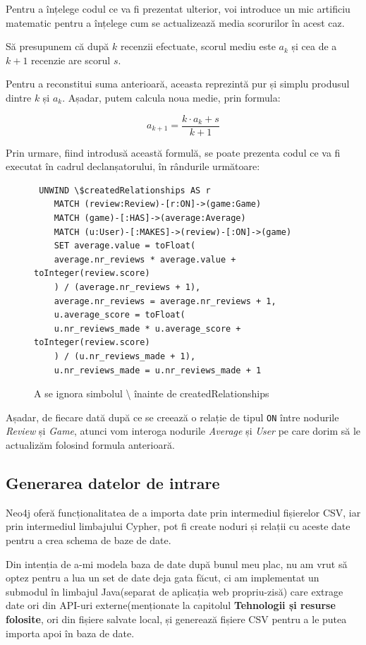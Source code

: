 \documentclass[12pt,a4paper]{report}
\begin{document}
Pentru a înțelege codul ce va fi prezentat ulterior, voi introduce un mic artificiu matematic pentru a înțelege cum se actualizează media scorurilor în acest caz.

\bigskip

Să presupunem că după \( k \) recenzii efectuate, scorul mediu este \( a_k \) și cea de a \( k+1 \) recenzie are scorul \( s \).

Pentru a reconstitui suma anterioară, aceasta reprezintă pur și simplu produsul dintre \( k \) și \( a_k \). Așadar, putem calcula noua medie, prin formula: 

\[ a_{k+1} = \frac{k \cdot a_k + s}{k+1} \]

Prin urmare, fiind introdusă această formulă, se poate prezenta codul ce va fi executat în cadrul declanșatorului, în rândurile următoare:

\begin{figure}[h]
\centering
\begin{BVerbatim}
 UNWIND \$createdRelationships AS r 
    MATCH (review:Review)-[r:ON]->(game:Game)
    MATCH (game)-[:HAS]->(average:Average)
    MATCH (u:User)-[:MAKES]->(review)-[:ON]->(game)
    SET average.value = toFloat(
    average.nr_reviews * average.value + toInteger(review.score)
    ) / (average.nr_reviews + 1),
	average.nr_reviews = average.nr_reviews + 1,
    u.average_score = toFloat(
    u.nr_reviews_made * u.average_score + toInteger(review.score)
    ) / (u.nr_reviews_made + 1),
    u.nr_reviews_made = u.nr_reviews_made + 1
\end{BVerbatim}
\caption*{A se ignora simbolul \textbackslash{ } înainte de createdRelationships}
\end{figure}

Așadar, de fiecare dată după ce se creează o relație de tipul \texttt{ON} între nodurile \emph{Review} și \emph{Game}, atunci vom interoga nodurile \emph{Average} și \emph{User} pe care dorim să le actualizăm folosind formula anterioară.

\subsection{Generarea datelor de intrare}

Neo4j oferă funcționalitatea de a importa date prin intermediul fișierelor CSV, iar prin intermediul limbajului Cypher, pot fi create noduri și relații cu aceste date pentru a crea schema de baze de date.

Din intenția de a-mi modela baza de date după bunul meu plac, nu am vrut să optez pentru a lua un set de date deja gata făcut, ci am implementat un submodul în limbajul Java(separat de aplicația web propriu-zisă) care extrage date ori din API-uri externe(menționate la capitolul \textbf{Tehnologii și resurse folosite}, ori din fișiere salvate local, și generează fișiere CSV pentru a le putea importa apoi în baza de date.
\end{document}
